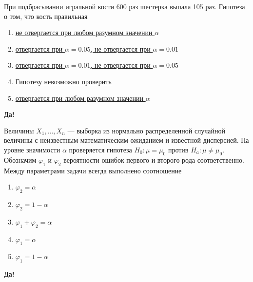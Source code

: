 \documentclass[t]{beamer}
\begin{document}
 \begin{frame} \label{13-Yes} 
\begin{block}{13} 

  При подбрасывании игральной кости 600 раз шестерка выпала 105 раз. Гипотеза о том, что кость правильная
  


 \end{block} 
\begin{enumerate} 
\item[] \hyperlink{13-Yes}{\beamergotobutton{} не отвергается при любом разумном значении $\alpha$}
\item[] \hyperlink{13-No}{\beamergotobutton{} отвергается при $\alpha = 0.05$, не отвергается при $\alpha = 0.01$}
\item[] \hyperlink{13-No}{\beamergotobutton{} отвергается при $\alpha = 0.01$, не отвергается при $\alpha = 0.05$}
\item[] \hyperlink{13-No}{\beamergotobutton{} Гипотезу невозможно проверить}
\item[] \hyperlink{13-No}{\beamergotobutton{} отвергается при любом разумном значении $\alpha$}
\end{enumerate} 

 \textbf{Да!} 
 \hyperlink{14}{}\end{frame} 


 \begin{frame} \label{14-Yes} 
\begin{block}{14} 

  Величины $X_1,\ldots,X_n$ — выборка из нормально распределенной случайной величины с неизвестным математическим ожиданием и известной дисперсией. На уровне значимости $\alpha$ проверяется гипотеза $H_0: \mu = \mu_0$ против $H_a: \mu \neq \mu_0$. Обозначим $\varphi_1$ и $\varphi_2$ вероятности ошибок первого и второго рода соответственно. Между параметрами задачи всегда выполнено соотношение
  


 \end{block} 
\begin{enumerate} 
\item[] \hyperlink{14-No}{\beamergotobutton{} $\varphi_2 = \alpha$}
\item[] \hyperlink{14-No}{\beamergotobutton{} $\varphi_2 = 1 - \alpha$}
\item[] \hyperlink{14-No}{\beamergotobutton{} $\varphi_1 + \varphi_2 = \alpha$}
\item[] \hyperlink{14-Yes}{\beamergotobutton{} $\varphi_1 = \alpha$}
\item[] \hyperlink{14-No}{\beamergotobutton{} $\varphi_1 = 1 - \alpha$}
\end{enumerate} 

 \textbf{Да!} 
 \hyperlink{15}{}\end{frame} 
\end{document}
